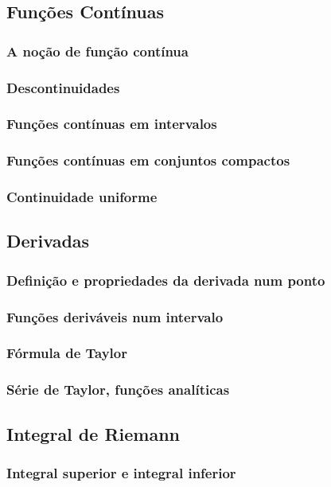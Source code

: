 \documentclass{article}
\theoremstyle{plain}
\theoremstyle{definition}
\theoremstyle{remark}
\begin{document}
\subsection{ Funções Contínuas}
   \subsubsection{ A noção de função contínua}
   \subsubsection{ Descontinuidades}
   \subsubsection{ Funções contínuas em intervalos}
   \subsubsection{ Funções contínuas em conjuntos compactos}
   \subsubsection{ Continuidade uniforme}
\subsection{ Derivadas}
   \subsubsection{ Definição e propriedades da derivada num ponto}
   \subsubsection{ Funções deriváveis num intervalo}
   \subsubsection{ Fórmula de Taylor}
   \subsubsection{ Série de Taylor, funções analíticas}
\subsection{ Integral de Riemann}
   \subsubsection{ Integral superior e integral inferior}
\end{document}
